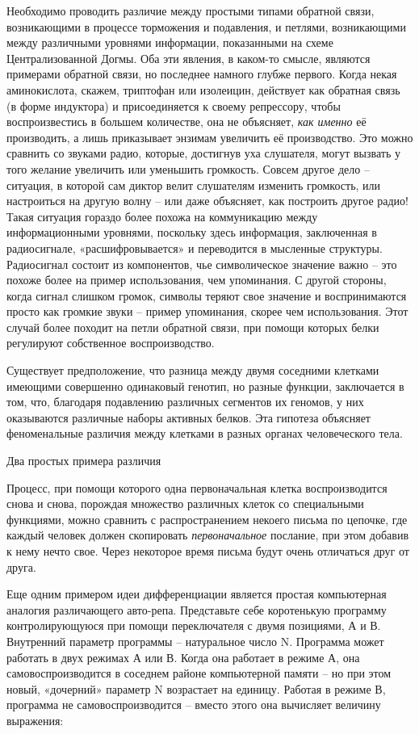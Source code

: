 \documentclass[../main.tex]{subfiles}
\begin{document}
Необходимо проводить различие между простыми типами обратной связи, возникающими в процессе торможения и подавления, и петлями, возникающими между различными уровнями информации, показанными на схеме Централизованной Догмы. Оба эти явления, в каком-то смысле, являются примерами обратной связи, но последнее намного глубже первого. Когда некая аминокислота, скажем, триптофан или изолеицин, действует как обратная связь (в форме индуктора) и присоединяется к своему репрессору, чтобы воспроизвестись в большем количестве, она не объясняет, \emph{как именно} её производить, а лишь приказывает энзимам увеличить её производство. Это можно сравнить со звуками радио, которые, достигнув уха слушателя, могут вызвать у того желание увеличить или уменьшить громкость. Совсем другое дело \--- ситуация, в которой сам диктор велит слушателям изменить громкость, или настроиться на другую волну \--- или даже объясняет, как построить другое радио! Такая ситуация гораздо более похожа на коммуникацию между информационными уровнями, поскольку здесь информация, заключенная в радиосигнале, «расшифровывается» и переводится в мысленные структуры. Радиосигнал состоит из компонентов, чье символическое значение важно \--- это похоже более на пример использования, чем упоминания. С другой стороны, когда сигнал слишком громок, символы теряют свое значение и воспринимаются просто как громкие звуки \--- пример упоминания, скорее чем использования. Этот случай более походит на петли обратной связи, при помощи которых белки регулируют собственное воспроизводство.

Существует предположение, что разница между двумя соседними клетками имеющими совершенно одинаковый генотип, но разные функции, заключается в том, что, благодаря подавлению различных сегментов их геномов, у них оказываются различные наборы активных белков. Эта гипотеза объясняет феноменальные различия между клетками в разных органах человеческого тела.

Два простых примера различия

Процесс, при помощи которого одна первоначальная клетка воспроизводится снова и снова, порождая множество различных клеток со специальными функциями, можно сравнить с распространением некоего письма по цепочке, где каждый человек должен скопировать \emph{первоначальное} послание, при этом добавив к нему нечто свое. Через некоторое время письма будут очень отличаться друг от друга.

Еще одним примером идеи дифференциации является простая компьютерная аналогия различающего авто-репа. Представьте себе коротенькую программу контролирующуюся при помощи переключателя с двумя позициями, А и В. Внутренний параметр программы \--- натуральное число N. Программа может работать в двух режимах А или В. Когда она работает в режиме А, она самовоспроизводится в соседнем районе компьютерной памяти \--- но при этом новый, «дочерний» параметр N возрастает на единицу. Работая в режиме В, программа не самовоспроизводится \--- вместо этого она вычисляет величину выражения:
\end{document}
